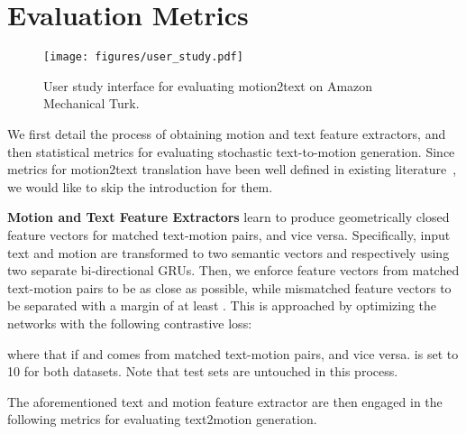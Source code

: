 \documentclass[runningheads]{llncs}
\newcommand{\beforefigcaption}{\vspace{-9mm}}
\newcommand{\afterfigcaption}{\vspace{-5mm}}
\newcommand{\beforesection}{\vspace{-2mm}}
\newcommand{\aftersection}{\vspace{-2mm}}
\begin{document}
\beforesection
\section{Evaluation Metrics}
\aftersection

\begin{figure*}[t]
	\centering
	\texttt{[image: figures/user\_study.pdf]}
		 \beforefigcaption
	\caption{User study interface for evaluating motion2text on Amazon Mechanical Turk.} 
	\label{fig:user_study}
	 \afterfigcaption
\end{figure*}

We first detail the process of obtaining motion and text feature extractors, and then statistical metrics for evaluating stochastic text-to-motion generation. Since metrics for motion2text translation have been well defined in existing literature~\cite{papineni2002bleu,zhang2019bertscore,lin2004rouge,vedantam2015cider}, we would like to skip the introduction for them.

\textbf{Motion and Text Feature Extractors} learn to produce geometrically closed feature vectors for matched text-motion pairs, and vice versa. Specifically, input text and motion are transformed to two semantic vectors  and  respectively using two separate bi-directional GRUs. Then, we enforce feature vectors from matched text-motion pairs to be as close as possible, while mismatched feature vectors to be separated with a margin of at least . This is approached by optimizing the networks with the following contrastive loss:

where  that  if  and  comes from matched text-motion pairs, and vice versa.  is set to 10 for both datasets. Note that test sets are untouched in this process.

The aforementioned text and motion feature extractor are then engaged in the following metrics for evaluating text2motion generation. 
\end{document}
